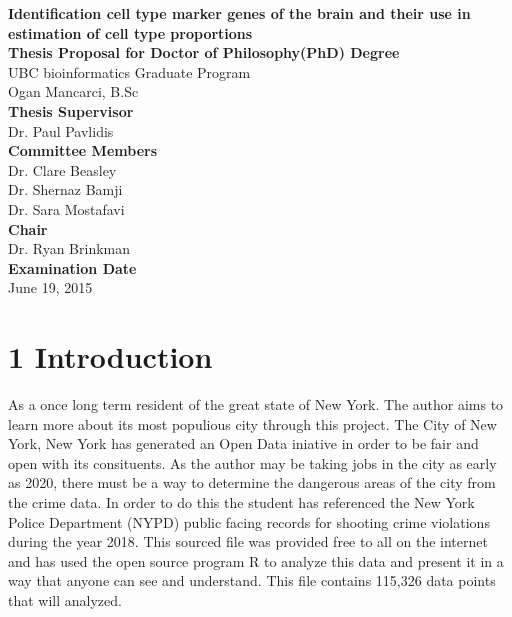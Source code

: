 \documentclass[]{article}
\title{}
\author{}
\date{}
\begin{document}
{}

\begin{center}
\LARGE{\textbf{Identification cell type marker genes of the brain and their use in estimation of cell type proportions}}\\
\vspace*{2\baselineskip}
\Large{\textbf{Thesis Proposal for Doctor of Philosophy(PhD) Degree}}\\
\normalsize{UBC bioinformatics Graduate Program}\\
\vspace*{2\baselineskip}
\Large{Ogan Mancarci, B.Sc}\\
\vspace*{3\baselineskip}
\Large{\textbf{Thesis Supervisor}}\\
Dr. Paul Pavlidis\\
\vspace*{2\baselineskip}
\Large{\textbf{Committee Members}}\\
Dr. Clare Beasley\\
Dr. Shernaz Bamji\\
Dr. Sara Mostafavi\\
\vspace*{1\baselineskip}
\Large{\textbf{Chair}}\\
Dr. Ryan Brinkman\\
\vspace*{1\baselineskip}
\Large{\textbf{Examination Date}}\\
June 19, 2015
\end{center}

\doublespacing

\hypersetup{linkcolor = black}
\newpage
{}
\tableofcontents
{}

\newpage

\hypersetup{linkcolor = blue}

\section{1 Introduction}\label{introduction}

As a once long term resident of the great state of New York. The author
aims to learn more about its most populious city through this project.
The City of New York, New York has generated an Open Data iniative in
order to be fair and open with its consituents. As the author may be
taking jobs in the city as early as 2020, there must be a way to
determine the dangerous areas of the city from the crime data. In order
to do this the student has referenced the New York Police Department
(NYPD) public facing records for shooting crime violations during the
year 2018. This sourced file was provided free to all on the internet
and has used the open source program R to analyze this data and present
it in a way that anyone can see and understand. This file contains
115,326 data points that will analyzed.
\end{document}
